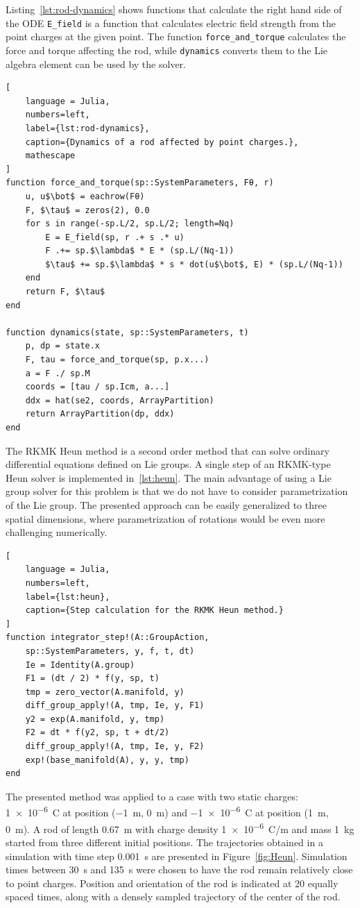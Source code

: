 \documentclass{juliacon}
\begin{document}
Listing~\ref{lst:rod-dynamics} shows functions that calculate the right hand side of the ODE \lstinline{E_field} is a function that calculates electric field strength from the point charges at the given point.
The function \lstinline{force_and_torque} calculates the force and torque affecting the rod, while \lstinline{dynamics} converts them to the Lie algebra element can be used by the solver.
\begin{lstlisting}[
    language = Julia,
    numbers=left,
    label={lst:rod-dynamics},
    caption={Dynamics of a rod affected by point charges.},
    mathescape
]
function force_and_torque(sp::SystemParameters, Fθ, r)
    u, u$\bot$ = eachrow(Fθ)
    F, $\tau$ = zeros(2), 0.0
    for s in range(-sp.L/2, sp.L/2; length=Nq)
        E = E_field(sp, r .+ s .* u)
        F .+= sp.$\lambda$ * E * (sp.L/(Nq-1))
        $\tau$ += sp.$\lambda$ * s * dot(u$\bot$, E) * (sp.L/(Nq-1))
    end
    return F, $\tau$
end

function dynamics(state, sp::SystemParameters, t)
    p, dp = state.x
    F, tau = force_and_torque(sp, p.x...)
    a = F ./ sp.M
    coords = [tau / sp.Icm, a...]
    ddx = hat(se2, coords, ArrayPartition)
    return ArrayPartition(dp, ddx)
end
\end{lstlisting}

The RKMK Heun method is a second order method that can solve ordinary differential equations defined on Lie groups.
A single step of an RKMK-type Heun solver is implemented in~\ref{lst:heun}.
The main advantage of using a Lie group solver for this problem is that we do not have to consider parametrization of the Lie group.
The presented approach can be easily generalized to three spatial dimensions, where parametrization of rotations would be even more challenging numerically.

\begin{lstlisting}[
    language = Julia,
    numbers=left,
    label={lst:heun},
    caption={Step calculation for the RKMK Heun method.}
]
function integrator_step!(A::GroupAction,
    sp::SystemParameters, y, f, t, dt)
    Ie = Identity(A.group)
    F1 = (dt / 2) * f(y, sp, t)
    tmp = zero_vector(A.manifold, y)
    diff_group_apply!(A, tmp, Ie, y, F1)
    y2 = exp(A.manifold, y, tmp)
    F2 = dt * f(y2, sp, t + dt/2)
    diff_group_apply!(A, tmp, Ie, y, F2)
    exp!(base_manifold(A), y, y, tmp)
end
\end{lstlisting}

The presented method was applied to a case with two static charges: \SI{1e-6}{C} at position (\SI{-1}{m}, \SI{0}{m}) and \SI{-1e-6}{C} at position (\SI{1}{m}, \SI{0}{m}).
A rod of length \SI{0.67}{m} with charge density \SI{1e-6}{C/m} and mass \SI{1}{kg} started from three different initial positions.
The trajectories obtained in a simulation with time step \SI{0.001}{s} are presented in Figure~\ref{fig:Heun}.
Simulation times between \SI{30}{s} and \SI{135}{s} were chosen to have the rod remain relatively close to point charges.
Position and orientation of the rod is indicated at 20 equally spaced times, along with a densely sampled trajectory of the center of the rod.
\end{document}
